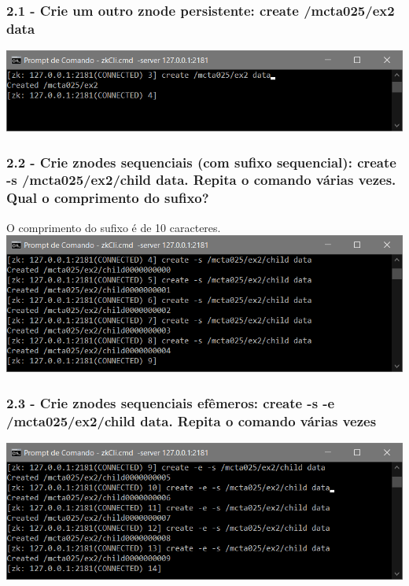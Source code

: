 \subsubsection{2.1 - Crie um outro znode persistente: create /mcta025/ex2 data}

\includegraphics{pratica3/prints/roteiro 2.1.PNG}

\subsubsection{2.2 - Crie znodes sequenciais (com sufixo sequencial): create -s
/mcta025/ex2/child data. Repita o comando várias vezes. Qual o
comprimento do sufixo?}
O comprimento do sufixo é de 10 caracteres.
\newline
\includegraphics{pratica3/prints/roteiro 2.2.PNG}

\subsubsection{2.3 - Crie znodes sequenciais efêmeros: create -s -e
/mcta025/ex2/child data. Repita o comando várias vezes}

\includegraphics{pratica3/prints/roteiro 2.3.PNG}

